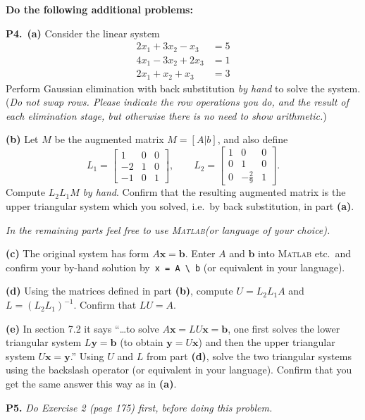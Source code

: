 \documentclass[12pt]{amsart}
\newcommand{\bb}{\mathbf{b}}
\newcommand{\bx}{\mathbf{x}}
\newcommand{\by}{\mathbf{y}}
\newcommand{\Matlab}{\textsc{Matlab}\xspace}
\newcommand{\prob}[1]{\bigskip\noindent\textbf{#1.}\quad }
\newcommand{\epart}[1]{\medskip\noindent\textbf{(#1)}\quad }
\newcommand{\ppart}[1]{\,\textbf{(#1)}\quad }
\begin{document}
\bigskip
\noindent \textbf{Do the following additional problems:}

\prob{P4}  \ppart{a}  Consider the linear system
\begin{align*}
2 x_1 + 3 x_2 - x_3 &= 5 \\
4 x_1 - 3 x_2 + 2 x_3 &= 1 \\
2 x_1 + x_2 + x_3 &= 3
\end{align*}
Perform Gaussian elimination with back substitution \emph{by hand} to solve the system.  (\emph{Do not swap rows.  Please indicate the row operations you do, and the result of each elimination stage, but otherwise there is no need to show arithmetic.})

\epart{b}  Let $M$ be the augmented matrix $M = \left[A \big| b\right]$, and also define
  $$L_1 = \begin{bmatrix}
  1 & 0 & 0 \\ -2 & 1 & 0 \\ -1 & 0 & 1
  \end{bmatrix}, \qquad
  L_2 = \begin{bmatrix}
  1 & 0 & 0 \\ 0 & 1 & 0 \\ 0 & -\frac{2}{9} & 1
  \end{bmatrix}.$$
Compute $L_2 L_1 M$ \emph{by hand}.  Confirm that the resulting augmented matrix is the upper triangular system which you solved, i.e.~by back substitution, in part \textbf{(a)}.

\medskip
\noindent \emph{In the remaining parts feel free to use \Matlab (or language of your choice).}

\epart{c}  The original system has form $A \bx = \bb$.  Enter $A$ and $\bb$ into \Matlab etc.~and confirm your by-hand solution by \,\verb|x = A \ b| (or equivalent in your language).

\epart{d}  Using the matrices defined in part \textbf{(b)}, compute $U=L_2 L_1 A$ and $L = (L_2 L_1)^{-1}$.  Confirm that $LU=A$.

\epart{e}  In section 7.2 it says ``\dots to solve $A\bx = LU\bx = \bb$, one first solves the lower triangular system $L\by = \bb$ (to obtain $\by = U\bx$) and then the upper triangular system $U\bx=\by$.''  Using $U$ and $L$ from part \textbf{(d)}, solve the two triangular systems using the backslash operator (or equivalent in your language).  Confirm that you get the same answer this way as in \textbf{(a)}.


\prob{P5}  \emph{Do Exercise 2 (page 175) first, before doing this problem.}
\end{document}
